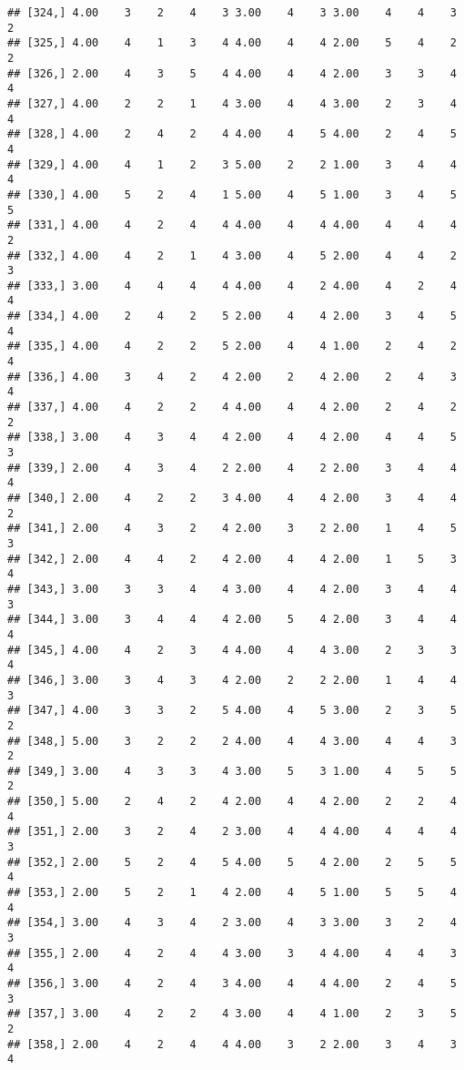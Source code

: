 \documentclass[]{article}
\begin{document}
\begin{verbatim}
## [324,] 4.00    3    2    4    3 3.00    4    3 3.00    4    4    3    2
## [325,] 4.00    4    1    3    4 4.00    4    4 2.00    5    4    2    2
## [326,] 2.00    4    3    5    4 4.00    4    4 2.00    3    3    4    4
## [327,] 4.00    2    2    1    4 3.00    4    4 3.00    2    3    4    4
## [328,] 4.00    2    4    2    4 4.00    4    5 4.00    2    4    5    4
## [329,] 4.00    4    1    2    3 5.00    2    2 1.00    3    4    4    4
## [330,] 4.00    5    2    4    1 5.00    4    5 1.00    3    4    5    5
## [331,] 4.00    4    2    4    4 4.00    4    4 4.00    4    4    4    2
## [332,] 4.00    4    2    1    4 3.00    4    5 2.00    4    4    2    3
## [333,] 3.00    4    4    4    4 4.00    4    2 4.00    4    2    4    4
## [334,] 4.00    2    4    2    5 2.00    4    4 2.00    3    4    5    4
## [335,] 4.00    4    2    2    5 2.00    4    4 1.00    2    4    2    4
## [336,] 4.00    3    4    2    4 2.00    2    4 2.00    2    4    3    4
## [337,] 4.00    4    2    2    4 4.00    4    4 2.00    2    4    2    2
## [338,] 3.00    4    3    4    4 2.00    4    4 2.00    4    4    5    3
## [339,] 2.00    4    3    4    2 2.00    4    2 2.00    3    4    4    4
## [340,] 2.00    4    2    2    3 4.00    4    4 2.00    3    4    4    2
## [341,] 2.00    4    3    2    4 2.00    3    2 2.00    1    4    5    3
## [342,] 2.00    4    4    2    4 2.00    4    4 2.00    1    5    3    4
## [343,] 3.00    3    3    4    4 3.00    4    4 2.00    3    4    4    3
## [344,] 3.00    3    4    4    4 2.00    5    4 2.00    3    4    4    4
## [345,] 4.00    4    2    3    4 4.00    4    4 3.00    2    3    3    4
## [346,] 3.00    3    4    3    4 2.00    2    2 2.00    1    4    4    3
## [347,] 4.00    3    3    2    5 4.00    4    5 3.00    2    3    5    2
## [348,] 5.00    3    2    2    2 4.00    4    4 3.00    4    4    3    2
## [349,] 3.00    4    3    3    4 3.00    5    3 1.00    4    5    5    2
## [350,] 5.00    2    4    2    4 2.00    4    4 2.00    2    2    4    4
## [351,] 2.00    3    2    4    2 3.00    4    4 4.00    4    4    4    3
## [352,] 2.00    5    2    4    5 4.00    5    4 2.00    2    5    5    4
## [353,] 2.00    5    2    1    4 2.00    4    5 1.00    5    5    4    4
## [354,] 3.00    4    3    4    2 3.00    4    3 3.00    3    2    4    3
## [355,] 2.00    4    2    4    4 3.00    3    4 4.00    4    4    3    4
## [356,] 3.00    4    2    4    3 4.00    4    4 4.00    2    4    5    3
## [357,] 3.00    4    2    2    4 3.00    4    4 1.00    2    3    5    2
## [358,] 2.00    4    2    4    4 4.00    3    2 2.00    3    4    3    4

\end{verbatim}
\end{document}
